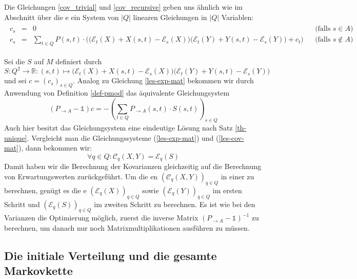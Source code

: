 \documentclass[a4paper]{article}
\theoremstyle{nonumberplain}
\begin{document}
Die Gleichungen \ref{cov_trivial} und \ref{cov_recursive} geben uns ähnlich wie im Abschnitt über die \expect{}e ein System von $|Q|$ linearen Gleichungen in $|Q|$ Variablen:
\begin{align}
\begin{aligned}
c_s & = & 0 && \text{(falls $s \in A$)}\\
c_s & = & \sum_{t \in Q}P(s,t) \cdot \Big( \big(\mathcal{E}_{t}(X) + X(s,t) - \mathcal{E}_{s}(X)\big)\big(\mathcal{E}_{t}(Y) + Y(s,t) - \mathcal{E}_{s}(Y)\big) + c_t\Big) && \text{(falls $s \notin A$)}
\end{aligned}
\end{align}

Sei die \reward{} $S$ auf $M$ definiert durch $S: Q^2 \to \mathbb{R} : (s,t) \mapsto \big(\mathcal{E}_{t}(X) + X(s,t) - \mathcal{E}_{s}(X)\big)\big(\mathcal{E}_{t}(Y) + Y(s,t) - \mathcal{E}_{s}(Y)\big)$ und sei $c = (c_s)_{s\in Q}$. Analog zu Gleichung \ref{les-exp-mat} bekommen wir durch Anwendung von Definition \ref{def-pmod} das äquivalente Gleichungsystem
\begin{equation}
(P_{\rightarrow A} - \mathbb{1}) c = - \left(\sum_{t \in Q}{ P_{\rightarrow A}(s,t) \cdot S(s,t) }\right)_{s \in Q}\label{les-cov-mat}
\end{equation}
Auch hier besitzt das Gleichungsystem eine eindeutige Lösung nach Satz \ref{th-unique}. Vergleicht man die Gleichungssysteme (\ref{les-exp-mat}) und (\ref{les-cov-mat}), dann bekommen wir:
\begin{equation}
\forall q \in Q : \mathcal{C}_q(X,Y) = \mathcal{E}_q(S)
\end{equation}
Damit haben wir die Berechnung der Kovarianzen gleichzeitig auf die Berechnung von Erwartungswerten zurückgeführt. Um die \cov{}en $(\mathcal{C}_q(X,Y))_{q\in Q}$ in einer \mc{} zu berechnen, genügt es die \expect{}e $(\mathcal{E}_q(X))_{q\in Q}$ sowie $(\mathcal{E}_q(Y))_{q\in Q}$ im ersten Schritt und $(\mathcal{E}_q(S))_{q\in Q}$ im zweiten Schritt zu berechnen. Es ist wie bei den Varianzen die Optimierung möglich, zuerst die inverse Matrix $(P_{\rightarrow A} - \mathbb{1})^{-1}$ zu berechnen, um danach nur noch Matrixmultiplikationen ausführen zu müssen.

\subsection{Die initiale Verteilung und die gesamte Markovkette}
\end{document}
